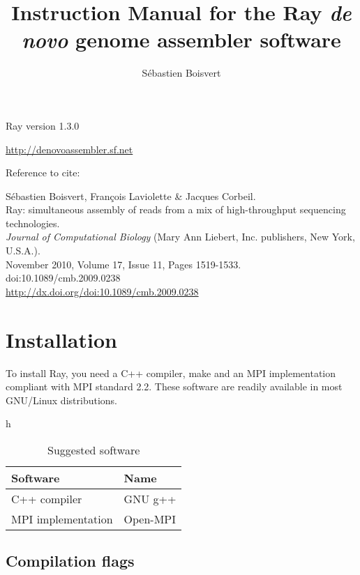 \documentclass{article}
\begin{document}
\author{Sébastien Boisvert}
\title{Instruction Manual for the Ray \emph{de novo} genome assembler software}
\maketitle


Ray version 1.3.0

\vspace{2cm}

\href{http://denovoassembler.sf.net}{http://denovoassembler.sf.net}

\vspace{2cm}

Reference to cite: 
\vspace{2cm}

\noindent
Sébastien Boisvert, François Laviolette \& Jacques Corbeil.\\
Ray: simultaneous assembly of reads from a mix of high-throughput sequencing technologies.\\
\emph{Journal of Computational Biology} (Mary Ann Liebert, Inc. publishers, New York, U.S.A.).\\
November 2010, Volume 17, Issue 11, Pages 1519-1533.\\
doi:10.1089/cmb.2009.0238\\
\href{http://dx.doi.org/doi:10.1089/cmb.2009.0238}{http://dx.doi.org/doi:10.1089/cmb.2009.0238}

\newpage
\tableofcontents
\newpage

\section{Installation}

To install Ray, you need a C++ compiler, make and an MPI implementation compliant
with MPI standard 2.2.
These software are readily available in most GNU/Linux distributions.

\begin{table}{h}
\caption{Suggested software}
\begin{tabular}{ll}
\hline
Software & Name \\
\hline
C++ compiler & GNU g++ \\
MPI implementation & Open-MPI \\
\hline
\end{tabular}
\end{table}



\subsection{Compilation flags}
\end{document}
